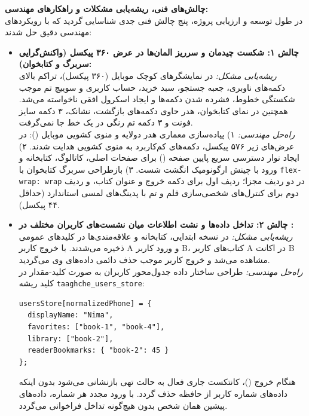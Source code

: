 \documentclass[12pt]{exam}
\begin{document}
\begin{questions}
\question
\textbf{چالش‌های فنی، ریشه‌یابی مشکلات و راهکارهای مهندسی:}
\\
در طول توسعه و ارزیابی پروژه، پنج چالش فنی جدی شناسایی گردید که با رویکردهای مهندسی دقیق حل شدند:
\begin{itemize}
    \item \textbf{چالش ۱: شکست چیدمان و سرریز المان‌ها در عرض ۳۶۰ پیکسل (واکنش‌گرایی سربرگ و کتابخوان):}
    \\
    \textit{ریشه‌یابی مشکل:} در نمایشگرهای کوچک موبایل (۳۶۰ پیکسل)، تراکم بالای دکمه‌های ناوبری، جعبه جستجو، سبد خرید، حساب کاربری و سوییچ تم موجب شکستگی خطوط، فشرده شدن دکمه‌ها و ایجاد اسکرول افقی ناخواسته می‌شد. همچنین در نمای کتابخوان، هدر حاوی دکمه‌های بازگشت، نشانک، ۳ دکمه سایز فونت و ۳ دکمه تم رنگی در یک خط جا نمی‌گرفت.
    \\
    \textit{راه‌حل مهندسی:}
    ۱) پیاده‌سازی معماری هدر دولایه و منوی کشویی موبایل (): در عرض‌های زیر ۵۷۶ پیکسل، دکمه‌های کم‌کاربرد به منوی کشویی هدایت شدند.
    ۲) ایجاد نوار دسترسی سریع پایین صفحه () برای صفحات اصلی، کاتالوگ، کتابخانه و ورود با چینش ارگونومیک انگشت شست.
    ۳) بازطراحی سربرگ کتابخوان با \texttt{flex-wrap: wrap} در دو ردیف مجزا؛ ردیف اول برای دکمه خروج و عنوان کتاب، و ردیف دوم برای کنترل‌های شخصی‌سازی قلم و تم با پدینگ‌های لمسی استاندارد (حداقل ۴۴ پیکسل).

    \item \textbf{چالش ۲: تداخل داده‌ها و نشت اطلاعات میان نشست‌های کاربران مختلف در :}
    \\
    \textit{ریشه‌یابی مشکل:} در نسخه ابتدایی، کتابخانه و علاقه‌مندی‌ها در کلیدهای عمومی ذخیره می‌شدند. با خروج کاربر A و ورود کاربر B، کتاب‌های کاربر A در اکانت B مشاهده می‌شد و خروج کاربر موجب حذف دائمی داده‌های وی می‌گردید.
    \\
    \textit{راه‌حل مهندسی:} طراحی ساختار داده جدول‌محور کاربران به صورت کلید-مقدار در کلید ریشه \texttt{taaghche\_users\_store}:
\begin{latin}
\begin{lstlisting}
usersStore[normalizedPhone] = {
  displayName: "Nima",
  favorites: ["book-1", "book-4"],
  library: ["book-2"],
  readerBookmarks: { "book-2": 45 }
};
\end{lstlisting}
\end{latin}
    هنگام خروج ()، کانتکست جاری فعال به حالت تهی بازنشانی می‌شود بدون اینکه داده‌های شماره کاربر از حافظه حذف گردد. با ورود مجدد هر شماره، داده‌های پیشین همان شخص بدون هیچ‌گونه تداخل فراخوانی می‌گردد.


\end{itemize}
\end{questions}
\end{document}
